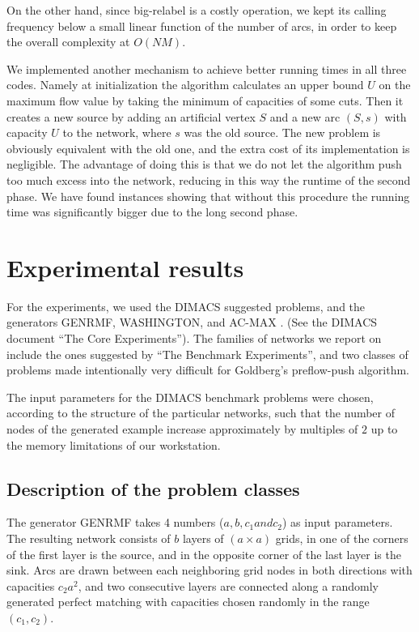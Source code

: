 On the other hand, since big-relabel is a costly operation, 
we kept its calling frequency below a small linear function of the
number of arcs, in order to keep the overall complexity at
$O(NM)$.  


We implemented another mechanism to achieve better running times in
all three codes. Namely at initialization the 
algorithm calculates an upper bound $U$ on the maximum flow value by
taking the minimum of capacities of some cuts. Then it creates a
new source by adding an artificial vertex $S$ and a new arc $(S, s)$
with capacity $U$ to the network, where $s$ was the old source.
The new problem is obviously equivalent with the old one, and the extra
cost of its implementation is negligible. The advantage of doing this
is that we do not let the algorithm push 
too much excess into the network, reducing in this way the runtime of
the second phase. We have found
instances showing that without this procedure the running time was
significantly bigger due to the long second phase. 

\section{Experimental results}

For the experiments, we used the DIMACS suggested problems, and the
generators GENRMF, WASHINGTON, and AC-MAX \cite{gen,wash,ac}.
(See the DIMACS document ``The Core Experiments'').
The families of networks we report on include the ones suggested by
``The Benchmark Experiments'', and two
classes of problems made intentionally very difficult for Goldberg's 
preflow-push algorithm.


The input parameters for the DIMACS benchmark problems were chosen,
according to the structure of the particular networks, such that the
number of nodes of the generated example increase approximately by
multiples of $2$ up to the memory limitations of our workstation.

\subsection{Description of the problem classes}

The generator GENRMF takes 4 numbers ($ a, b, c_1 and c_2 $) as input parameters. The resulting network consists of $ b$ layers
of $ (a \times a)$ grids, in one of the
corners of the first layer is the source, and in the opposite corner
of the last layer is the sink. Arcs are drawn between each neighboring grid nodes in both
directions with capacities $ c_2a^2 $, and two
consecutive layers are connected along a randomly generated perfect
matching with capacities chosen randomly in the range $(c_1, c_2)$. 


